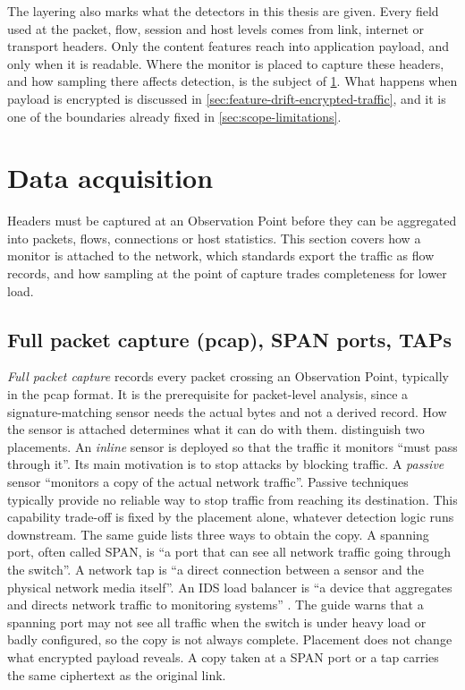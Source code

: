 The layering also marks what the detectors in this thesis are given. Every
field used at the packet, flow, session and host levels comes from link,
internet or transport headers. Only the content features reach into
application payload, and only when it is readable. Where the monitor is
placed to capture these headers, and how sampling there affects detection,
is the subject of \cref{sec:data-acquisition}. What happens when payload is
encrypted is discussed in \cref{sec:feature-drift-encrypted-traffic}, and it
is one of the boundaries already fixed in \cref{sec:scope-limitations}.

\section{Data acquisition}
\label{sec:data-acquisition}

Headers must be captured at an Observation Point before they can be
aggregated into packets, flows, connections or host statistics. This section
covers how a monitor is attached to the network, which standards export the
traffic as flow records, and how sampling at the point of capture trades
completeness for lower load.

\subsection{Full packet capture (pcap), SPAN ports, TAPs}
\label{sec:packet-capture-mechanisms}

\emph{Full packet capture} records every packet crossing an Observation
Point, typically in the pcap format. It is the prerequisite for packet-level
analysis, since a signature-matching sensor needs the actual bytes and not a
derived record. How the sensor is attached determines what it can do with
them. \citet{scarfone2007nist80094} distinguish two placements. An
\emph{inline} sensor is deployed so that the traffic it monitors ``must pass
through it''. Its main motivation is to stop attacks by blocking traffic. A
\emph{passive} sensor ``monitors a copy of the actual network traffic''.
Passive techniques typically provide no reliable way to stop traffic from
reaching its destination. This capability trade-off is fixed by the
placement alone, whatever detection logic runs downstream. The same guide
lists three ways to obtain the copy. A spanning port, often called SPAN, is
``a port that can see all network traffic going through the switch''. A
network tap is ``a direct connection between a sensor and the physical
network media itself''. An IDS load balancer is ``a device that aggregates
and directs network traffic to monitoring systems''
\citep{scarfone2007nist80094}. The guide warns that a spanning port may not
see all traffic when the switch is under heavy load or badly configured, so
the copy is not always complete. Placement does not change what encrypted
payload reveals. A copy taken at a SPAN port or a tap carries the same
ciphertext as the original link.

